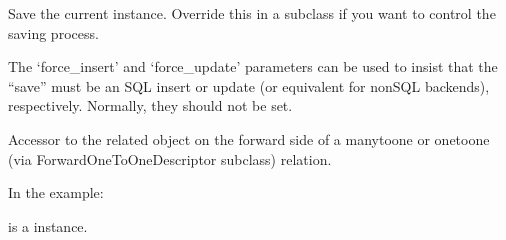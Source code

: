 \documentclass[letterpaper,10pt,english]{sphinxmanual}
\begin{document}
\begin{fulllineitems}
\begin{fulllineitems}
\label{\detokenize{payments:payments.models.MemberTransaction.save}}
Save the current instance. Override this in a subclass if you want to
control the saving process.

The ‘force\_insert’ and ‘force\_update’ parameters can be used to insist
that the “save” must be an SQL insert or update (or equivalent for
non\sphinxhyphen{}SQL backends), respectively. Normally, they should not be set.

\end{fulllineitems}


\begin{fulllineitems}
\label{\detokenize{payments:payments.models.MemberTransaction.stripe_transaction}}
Accessor to the related object on the forward side of a many\sphinxhyphen{}to\sphinxhyphen{}one or
one\sphinxhyphen{}to\sphinxhyphen{}one (via ForwardOneToOneDescriptor subclass) relation.

In the example:

\begin{sphinxVerbatim}[commandchars=\\\{\}]
 
       
\end{sphinxVerbatim}

 is a  instance.

\end{fulllineitems}


\begin{fulllineitems}
\label{\detokenize{payments:payments.models.MemberTransaction.stripe_transaction_id}}
\end{fulllineitems}


\end{fulllineitems}
\end{document}
